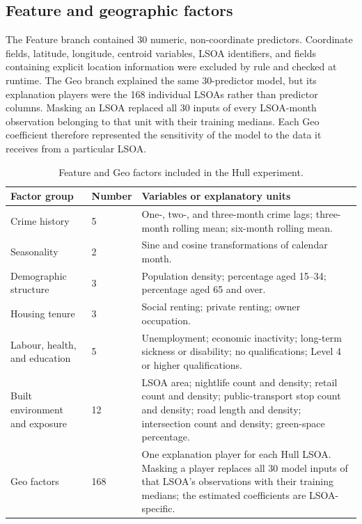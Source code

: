 \subsection{Feature and geographic factors}
\label{sec:hull_factors}

The Feature branch contained 30 numeric, non-coordinate predictors. Coordinate fields, latitude, longitude, centroid variables, LSOA identifiers, and fields containing explicit location information were excluded by rule and checked at runtime. The Geo branch explained the same 30-predictor model, but its explanation players were the 168 individual LSOAs rather than predictor columns. Masking an LSOA replaced all 30 inputs of every LSOA-month observation belonging to that unit with their training medians. Each Geo coefficient therefore represented the sensitivity of the model to the data it receives from a particular LSOA.

\begin{table}[H]
\centering
\caption{Feature and Geo factors included in the Hull experiment.}
\label{tab:hull_factor_groups}
\small
\begin{tabularx}{\textwidth}{p{} p{} X}
\toprule
Factor group & Number & Variables or explanatory units \\
\midrule
Crime history & 5 &
One-, two-, and three-month crime lags; three-month rolling mean; six-month rolling mean. \\
Seasonality & 2 &
Sine and cosine transformations of calendar month. \\
Demographic structure & 3 &
Population density; percentage aged 15--34; percentage aged 65 and over. \\
Housing tenure & 3 &
Social renting; private renting; owner occupation. \\
Labour, health, and education & 5 &
Unemployment; economic inactivity; long-term sickness or disability; no qualifications; Level 4 or higher qualifications. \\
Built environment and exposure & 12 &
LSOA area; nightlife count and density; retail count and density; public-transport stop count and density; road length and density; intersection count and density; green-space percentage. \\
Geo factors & 168 &
One explanation player for each Hull LSOA. Masking a player replaces all 30 model inputs of that LSOA's observations with their training medians; the estimated coefficients are LSOA-specific. \\
\bottomrule
\end{tabularx}
\end{table}

